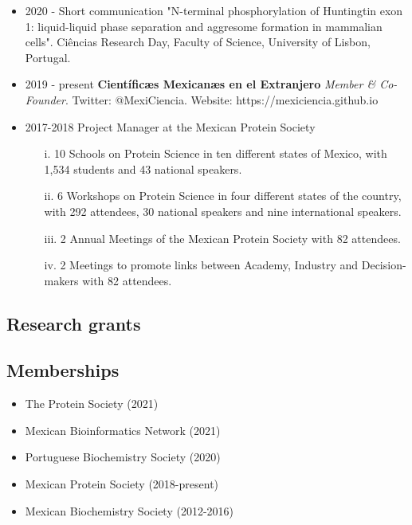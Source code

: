 \documentclass[letterpaper,11pt]{article}
\begin{document}
\begin{itemize}
\item 2020 - Short communication "N-terminal phosphorylation of Huntingtin exon 1: liquid-liquid phase separation and aggresome formation in mammalian cells".  Ciências Research Day, Faculty of Science, University of Lisbon, Portugal.
\item 2019 - present \textbf{Científicæs Mexicanæs en el Extranjero}  \textit{Member \& Co-Founder}. Twitter: @MexiCiencia.  Website: https://mexiciencia.github.io

\item 2017-2018 Project Manager at the Mexican Protein Society \\ %
\begin{itemize}
\item [i.] 10 Schools on Protein Science in ten different states of Mexico, with 1,534 students and 43 national speakers. \\
\item [ii.] 6 Workshops on Protein Science in four different states of the country, with 292 attendees, 30 national speakers and nine international speakers.
\item [iii.] 2 Annual Meetings of the Mexican Protein Society with 82 attendees.
\item [iv.] 2 Meetings to promote links between Academy, Industry and Decision-makers with  82 attendees.
\end{itemize}
\end{itemize}


\subsection*{Research grants}
\subsection*{Memberships}
\begin{itemize}
\item The Protein Society (2021)
\item Mexican Bioinformatics Network (2021)
\item Portuguese Biochemistry Society (2020)
\item Mexican Protein Society (2018-present)
\item Mexican Biochemistry Society (2012-2016)
\end{itemize}
\end{document}
